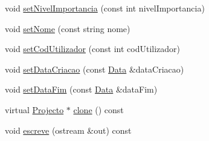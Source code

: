 \begin{DoxyCompactItemize}
\item 
void \hyperlink{class_projecto_abe3038d9b1faa7d8a687f666317fdc8a}{set\-Nivel\-Importancia} (const int nivel\-Importancia)
\item 
void \hyperlink{class_projecto_a5567cf58176b0b34d7346784f9607b97}{set\-Nome} (const string nome)
\item 
void \hyperlink{class_projecto_af6d630189707f68f88ad69f241e8c39c}{set\-Cod\-Utilizador} (const int cod\-Utilizador)
\item 
void \hyperlink{class_projecto_a4d25ff7102c97ab54712311b5edd5d9f}{set\-Data\-Criacao} (const \hyperlink{class_data}{Data} \&data\-Criacao)
\item 
void \hyperlink{class_projecto_ab77f3936f25818402316c14a2d106589}{set\-Data\-Fim} (const \hyperlink{class_data}{Data} \&data\-Fim)
\item 
virtual \hyperlink{class_projecto}{Projecto} $\ast$ \hyperlink{class_projecto_ad024a33b84dd921c924769857deb5d5d}{clone} () const 
\item 
void \hyperlink{class_projecto_ab389e6154cf76c46ac8a0cad436cb928}{escreve} (ostream \&out) const 
\end{DoxyCompactItemize}



